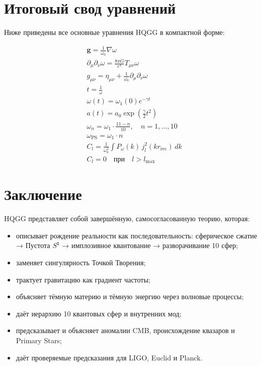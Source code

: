 \documentclass[12pt,a4paper]{article}
\begin{document}
\section{Итоговый свод уравнений}

Ниже приведены все основные уравнения HQGG в компактной форме:

\[
\boxed{
\begin{aligned}
& \mathbf{g} = \frac{1}{\omega_0} \nabla \omega \\
& \partial_\mu \partial_\nu \omega = \frac{8\pi G}{c^4} T_{\mu\nu} \omega \\
& g_{\mu\nu} = \eta_{\mu\nu} + \frac{1}{\omega_0} \partial_\mu \partial_\nu \omega \\
& t = \frac{1}{\omega} \\
& \omega(t) = \omega_1(0) e^{-\gamma t} \\
& a(t) = a_0 \exp\left(\frac{\gamma}{2} t^2\right) \\
& \omega_n = \omega_1 \cdot \frac{11-n}{10}, \quad n=1,\dots,10 \\
& \omega_{\text{PS}} = \omega_1 \cdot n \\
& C_l = \frac{1}{\omega_0^2} \int P_\omega(k) \, j_l^2(k r_{\text{rec}}) \, dk \\
& C_l = 0 \quad \text{при} \quad l > l_{\max}
\end{aligned}
}
\]

\section{Заключение}

HQGG представляет собой завершённую, самосогласованную теорию, которая:

\begin{itemize}
\item описывает рождение реальности как последовательность: сферическое сжатие → Пустота \( S^{\text{בּ}} \) → имплозивное квантование → разворачивание 10 сфер;
\item заменяет сингулярность Точкой Творения;
\item трактует гравитацию как градиент частоты;
\item объясняет тёмную материю и тёмную энергию через волновые процессы;
\item даёт иерархию 10 квантовых сфер и внутренних мод;
\item предсказывает и объясняет аномалии CMB, происхождение квазаров и Primary Stars;
\item даёт проверяемые предсказания для LIGO, Euclid и Planck.
\end{itemize}
\end{document}

